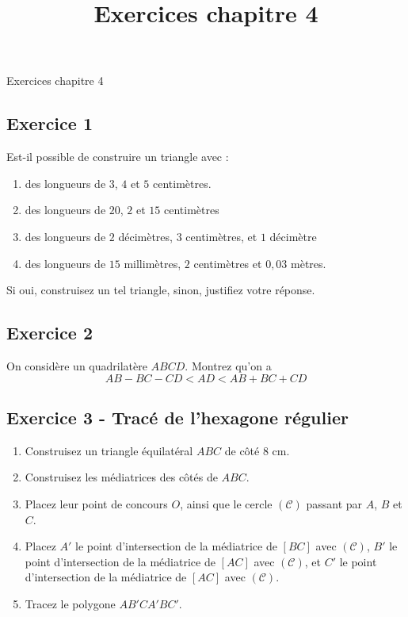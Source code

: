 \documentclass[14 pt]{extarticle}
\title{Exercices chapitre 4}
\date{}
\theoremstyle{plain}
\begin{document}
\begin{center}{\Large Exercices chapitre 4}\\ 
 \end{center}
 \subsection*{Exercice 1}
  
 Est-il possible de construire un triangle avec : 
 
 \begin{enumerate}
 \item des longueurs de $3$, $4$ et $5$ centimètres.
 \item des longueurs de $20$, $2$ et $15$ centimètres
 \item des longueurs de $2$ décimètres, $3$ centimètres, et $1$ décimètre
 \item des longueurs de $15$ millimètres, $2$ centimètres et $0,03$ mètres.
 \end{enumerate}
 Si oui, construisez un tel triangle, sinon, justifiez votre réponse. 


 \subsection*{Exercice 2}
 
 
On considère un quadrilatère $ABCD$. Montrez qu'on a \[ AB - BC - CD < AD < AB + BC + CD\] 


\subsection*{Exercice 3 - Tracé de l'hexagone régulier}

\begin{enumerate}

\item Construisez un triangle équilatéral $ABC$ de côté $8$ cm. 
\item Construisez les médiatrices des côtés de $ABC$.
\item Placez leur point de concours $O$, ainsi que le cercle $(\mathcal C)$ passant par $A$, $B$ et $C$. 
\item Placez $A'$ le point d'intersection de la médiatrice de $[BC]$ avec $(\mathcal C)$, $B'$ le point d'intersection de la médiatrice de $[AC]$ avec $(\mathcal C)$, et $C'$ le point d'intersection de la médiatrice de $[AC]$ avec $(\mathcal C)$.
\item Tracez le polygone $AB'CA'BC'$. 
\end{enumerate}
\end{document}
